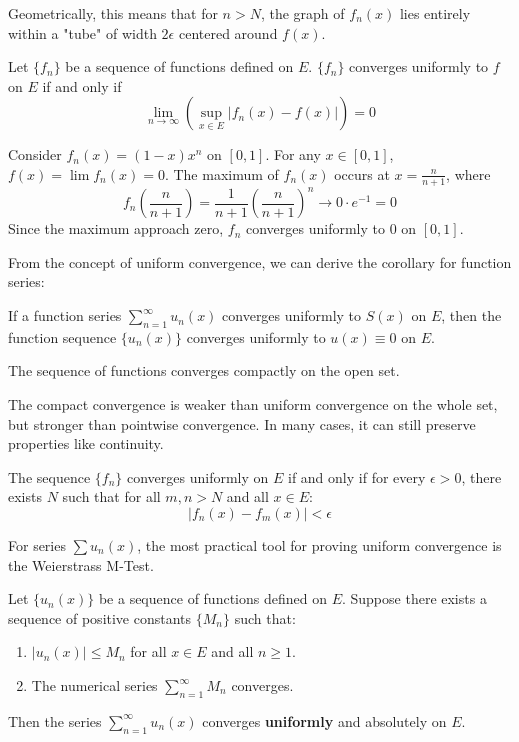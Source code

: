 \documentclass[oneside]{book}
\begin{document}
Geometrically, this means that for $n > N$, the graph of $f_n(x)$ lies entirely within a "tube" of width $2\epsilon$ centered around $f(x)$.

\begin{theorem}
Let $\{f_n\}$ be a sequence of functions defined on $E$. $\{f_n\}$ converges uniformly to $f$ on $E$ if and only if
\[ \lim_{n \to \infty} \left( \sup_{x \in E} |f_n(x) - f(x)| \right) = 0 \]
\end{theorem}

\begin{example}
Consider $f_n(x) = (1-x)x^n$ on $[0,1]$. For any $x \in [0,1]$, $f(x) = \lim f_n(x) = 0$.
The maximum of $f_n(x)$ occurs at $x = \frac{n}{n+1}$, where
\[ f_n\left(\frac{n}{n+1}\right) = \frac{1}{n+1} \left(\frac{n}{n+1}\right)^n \to 0 \cdot e^{-1} = 0 \]
Since the maximum approach zero, $f_n$ converges uniformly to $0$ on $[0,1]$.
\end{example}

From the concept of uniform convergence, we can derive the corollary for function series:

\begin{corollary}
    If a function series $\sum_{n=1}^{\infty} u_n(x)$ converges uniformly to $S(x)$ on $E$, then the function sequence $\{u_n(x)\}$ converges uniformly to $u(x) \equiv 0$ on $E$.
\end{corollary}

\begin{definition}
    The sequence of functions converges compactly on the open set.
\end{definition}

The compact convergence is weaker than uniform convergence on the whole set, but stronger than pointwise convergence. In many cases, it can still preserve properties like continuity.

\begin{theorem}
The sequence $\{f_n\}$ converges uniformly on $E$ if and only if for every $\epsilon > 0$, there exists $N$ such that for all $m, n > N$ and all $x \in E$:
\[ |f_n(x) - f_m(x)| < \epsilon \]
\end{theorem}

For series $\sum u_n(x)$, the most practical tool for proving uniform convergence is the Weierstrass M-Test.

\begin{theorem}
Let $\{u_n(x)\}$ be a sequence of functions defined on $E$. Suppose there exists a sequence of positive constants $\{M_n\}$ such that:
\begin{enumerate}
    \item $|u_n(x)| \le M_n$ for all $x \in E$ and all $n \ge 1$.
    \item The numerical series $\sum_{n=1}^{\infty} M_n$ converges.
\end{enumerate}
Then the series $\sum_{n=1}^{\infty} u_n(x)$ converges \textbf{uniformly} and absolutely on $E$.
\end{theorem}
\end{document}

